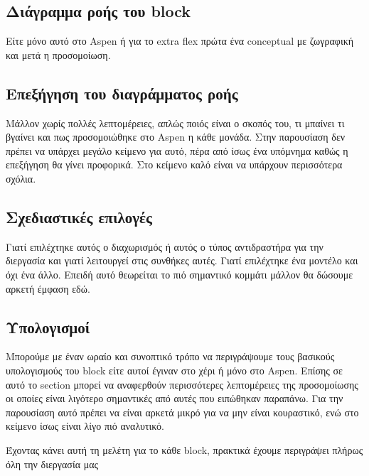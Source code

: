 \documentclass[11pt]{article}
\begin{document}
\subsection{Διάγραμμα ροής του block}
\label{sec:org78b7620}
Είτε μόνο αυτό στο Aspen ή για το extra flex πρώτα ένα conceptual με ζωγραφική και μετά η προσομοίωση.

\subsection{Επεξήγηση του διαγράμματος ροής}
\label{sec:org77f3f61}
Μάλλον χωρίς πολλές λεπτομέρειες, απλώς ποιός είναι ο σκοπός του, τι μπαίνει τι βγαίνει και πως προσομοιώθηκε στο Aspen η κάθε μονάδα. Στην παρουσίαση δεν πρέπει να υπάρχει μεγάλο κείμενο για αυτό, πέρα από ίσως ένα υπόμνημα καθώς η επεξήγηση θα γίνει προφορικά. Στο κείμενο καλό είναι να υπάρχουν περισσότερα σχόλια.

\subsection{Σχεδιαστικές επιλογές}
\label{sec:org9ce3346}
Γιατί επιλέχτηκε αυτός ο διαχωρισμός ή αυτός ο τύπος αντιδραστήρα για την διεργασία και γιατί λειτουργεί στις συνθήκες αυτές. Γιατί επιλέχτηκε ένα μοντέλο και όχι ένα άλλο. Επειδή αυτό θεωρείται το πιό σημαντικό κομμάτι μάλλον θα δώσουμε αρκετή έμφαση εδώ.

\subsection{Υπολογισμοί}
\label{sec:org422ac8c}
Μπορούμε με έναν ωραίο και συνοπτικό τρόπο να περιγράψουμε τους βασικούς υπολογισμούς του block είτε αυτοί έγιναν στο χέρι ή μόνο στο Aspen. Επίσης σε αυτό το section μπορεί να αναφερθούν περισσότερες λεπτομέρειες της προσομοίωσης οι οποίες είναι λιγότερο σημαντικές από αυτές που ειπώθηκαν παραπάνω. Για την παρουσίαση αυτό πρέπει να είναι αρκετά μικρό για να μην είναι κουραστικό, ενώ στο κείμενο ίσως είναι λίγο πιό αναλυτικό.

Έχοντας κάνει αυτή τη μελέτη για το κάθε block, πρακτικά έχουμε περιγράψει πλήρως όλη την διεργασία μας 
\end{document}
